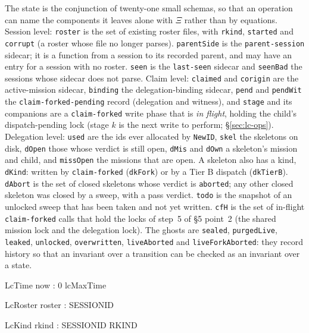 \documentclass[a4paper,10pt,fleqn]{article}
\newcommand{\fpath}[1]{\texttt{#1}}
\newcommand{\field}[1]{\texttt{#1}}
\begin{document}
The state is the conjunction of twenty-one small schemas, so that an
operation can name the components it leaves alone with $\Xi$ rather than
by equations. Session level: \field{roster} is the set of existing roster
files, with \field{rkind}, \field{started} and \field{corrupt} (a roster
whose file no longer parses). \field{parentSide} is the
\fpath{parent-session} sidecar; it is a function from a session to its
recorded parent, and may have an entry for a session with no roster.
\field{seen} is the \fpath{last-seen} sidecar and \field{seenBad} the
sessions whose sidecar does not parse. Claim level: \field{claimed} and
\field{corigin} are the active-mission sidecar, \field{binding} the
delegation-binding sidecar, \field{pend} and \field{pendWit} the
\fpath{claim-forked-pending} record (delegation and witness), and
\field{stage} and its companions are a \field{claim-forked} write phase that
is \emph{in flight}, holding the child's dispatch-pending lock (stage $k$
is the next write to perform; \S\ref{sec:lc-ops}). Delegation level:
\field{used} are the ids ever allocated by \field{NewID}, \field{skel} the
skeletons on disk, \field{dOpen} those whose verdict is still open,
\field{dMis} and \field{dOwn} a skeleton's mission and child, and
\field{missOpen} the missions that are open. A skeleton also has a
kind, \field{dKind}: written by \field{claim-forked} (\field{dkFork}) or by a
Tier B dispatch (\field{dkTierB}). \field{dAbort} is the set of closed
skeletons whose verdict is \field{aborted}; any other closed skeleton was
closed by a sweep, with a pass verdict. \field{todo} is the snapshot of an
unlocked sweep that has been taken and not yet written. \field{cfH} is the
set of in-flight \field{claim-forked} calls that hold the locks of step~5
of \S5 point~2 (the shared mission lock and the delegation lock). The
ghosts are \field{sealed}, \field{purgedLive}, \field{leaked},
\field{unlocked}, \field{overwritten}, \field{liveAborted} and
\field{liveForkAborted}: they record history so that an invariant over a
transition can be checked as an invariant over a state.

\begin{schema}{LcTime}
now : 0 \upto lcMaxTime
\end{schema}

\begin{schema}{LcRoster}
roster : \power SESSIONID
\end{schema}

\begin{schema}{LcKind}
rkind : SESSIONID \pfun RKIND
\end{schema}
\end{document}
